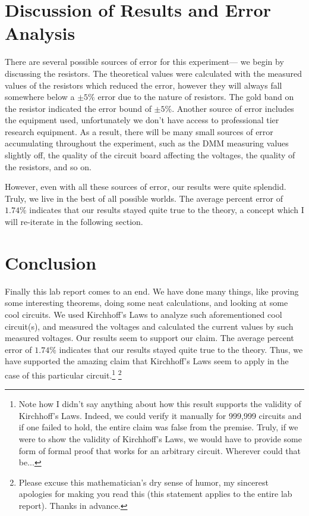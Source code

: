 \documentclass{article}
\begin{document}
\section{Discussion of Results and Error Analysis} 
There are several possible sources of error for this experiment— we begin by discussing the resistors. 
The theoretical values were calculated with the measured values of the resistors which reduced the error, however
they will always fall somewhere below a $\pm 5\%$ error due to the nature of resistors. The gold band on the resistor indicated the error bound of 
$\pm 5\%$. Another source of error includes the equipment used, unfortunately we don't have access to professional tier research equipment. 
As a result, there will be many small sources of error accumulating throughout the experiment, such as the DMM measuring values slightly off, the quality of the circuit board affecting the voltages, 
the quality of the resistors, and so on.

However, even with all these sources of error, our results were quite splendid. Truly, we live in the best of all possible worlds. 
The average percent error of $1.74\%$ indicates that our results stayed quite true to the theory, a concept which I will re-iterate in the following section.
\section{Conclusion}
Finally this lab report comes to an end. We have done many things, like proving some interesting theorems, doing some neat calculations, and looking at some cool circuits. 
We used Kirchhoff's Laws to analyze such aforementioned cool circuit(s), and measured the voltages and calculated the current values by such measured voltages.
Our results seem to support our claim. The average percent error of $1.74\%$ indicates that our results stayed quite true to the theory. Thus, we have supported the amazing claim that
Kirchhoff's Laws seem to apply in the case of this particular circuit.\footnote{Note how I didn't say anything about how this result supports the validity of Kirchhoff's Laws. Indeed, we could verify it manually for 999,999 circuits and if one failed to hold, the entire claim was false from the premise. Truly, if we were to show the validity of Kirchhoff's Laws, we would have to provide some form of formal proof that works for an arbitrary circuit. Wherever could that be...}
\footnote{Please excuse this mathematician's dry sense of humor, my sincerest apologies for making you read this (this statement applies to the entire lab report). Thanks in advance.} 
\end{document}
